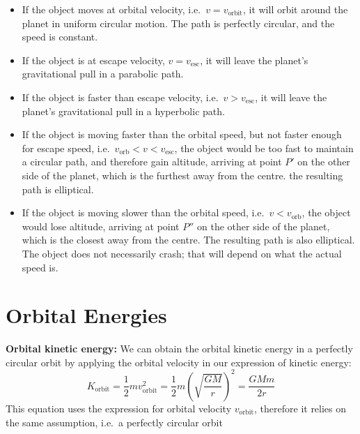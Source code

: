 \begin{itemize}[itemsep=6pt]
\item{\color{magenta}If the object moves at orbital velocity, i.e.\
  $v=v_\text{orbit}$, it will orbit around the planet in uniform circular
  motion. The path is perfectly circular, and the speed is constant.}
  
\item{\color{violet}If the object is at escape velocity, $v=v_\text{esc}$, it
  will leave the planet's gravitational pull in a parabolic path.}
  
\item{\color{green!80!black}If the object is faster than escape velocity, i.e.\
    $v>v_\text{esc}$, it will leave the planet's gravitational pull in a
  hyperbolic path.}
  
\item{\color{orange} If the object is moving faster than the orbital speed, but
  not faster enough for escape speed, i.e.\ $v_\text{orb}<v<v_\text{esc}$, the
  object would be too fast to maintain a circular path, and therefore gain
  altitude, arriving at point $P'$ on the other side of the planet, which is
  the furthest away from the centre. the resulting path is elliptical.}
  
\item{\color{blue} If the object is moving slower than the orbital speed, i.e.\
  $v<v_\text{orb}$, the object would lose altitude, arriving at point $P''$ on
  the other side of the planet, which is the closest away from the centre. The
  resulting path is also elliptical. The object does not necessarily crash; that
  will depend on what the actual speed is.}
\end{itemize}



\section{Orbital Energies}

\textbf{Orbital kinetic energy:} We can obtain the orbital kinetic energy in a
perfectly circular orbit by applying the orbital velocity in our expression of
kinetic energy:
\begin{equation}
  K_\text{orbit}=\frac12mv_\text{orbit}^2=\frac12m
  \left(\sqrt{\frac{GM}r}\right)^2=\boxed{\frac{GMm}{2r}}
\end{equation}
This equation uses the expression for orbital velocity $v_\text{orbit}$,
therefore it relies on the same assumption, i.e.\ a perfectly circular orbit



